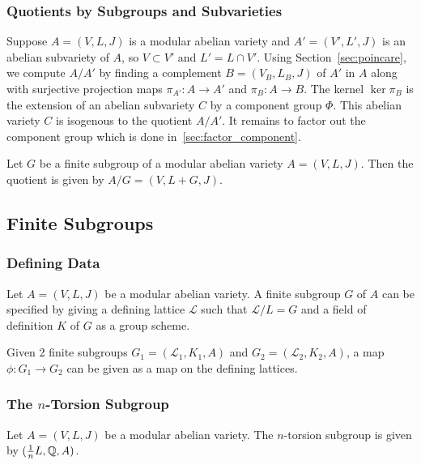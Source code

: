 \documentclass{article}
\begin{document}
\subsubsection{Quotients by Subgroups and Subvarieties}

\label{sec:quotients}

Suppose $A = (V, L, J)$ is a modular abelian variety and $A' = (V',
	L', J)$ is an abelian subvariety of $A$, so $V\subset V'$ and $L' =
	L\cap V'$. Using Section~\ref{sec:poincare}, we compute $A/A'$ by
finding a complement $B=(V_B,L_B,J)$ of $A'$ in $A$ along with
surjective projection maps $\pi_{A'}: A \to A'$ and $\pi_B: A\to B$.
The kernel $\ker \pi_B$ is the extension of an abelian subvariety $C$ by a
component group $\Phi$. This abelian variety $C$ is isogenous to the quotient
$A/A'$. It remains to factor out the component group which is done
in~\ref{sec:factor_component}.


Let $G$ be a finite subgroup of a modular abelian variety $A=(V, L, J)$. Then
the quotient is given by $A/G = (V, L+G, J)$.

\subsection{Finite Subgroups}

\subsubsection{Defining Data}

Let $A=(V, L, J)$ be a modular abelian variety. A finite subgroup $G$ of $A$
can be specified by giving a defining lattice $\mathcal{L}$ such that
$\mathcal{L}/L = G$ and a field of definition $K$ of $G$ as a group scheme.

Given 2 finite subgroups $G_1=(\mathcal{L}_1, K_1, A)$ and $G_2=(\mathcal{L}_2,
	K_2, A)$, a map $\phi: G_1\to G_2$ can be given as a map on the defining
lattices.

\subsubsection{The $n$-Torsion Subgroup}

Let $A=(V, L, J)$ be a modular abelian variety. The $n$-torsion subgroup is
given by $(\frac{1}{n} L, \mathbb{Q}, A)$.
\end{document}
